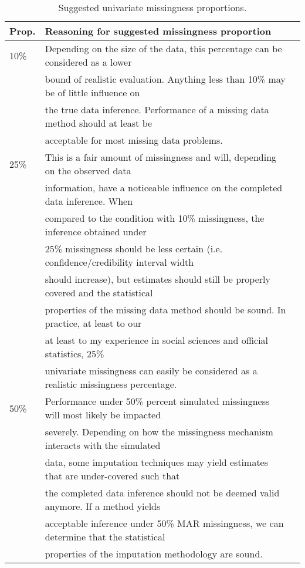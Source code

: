 \documentclass[bimj,fleqn]{w-art}
\begin{document}
\begin{table}[htb]
\begin{center}
\caption{Suggested univariate missingness proportions.}
\label{table:prop}
\begin{tabular}{lll}
\hline
Prop. & Reasoning for suggested missingness proportion \\
\hline  
10\%  & Depending on the size of the data, this percentage can be considered as a lower \\
      & bound of realistic evaluation. Anything less than 10\% may be of little influence on \\
      & the true data inference. Performance of a missing data method should at least be \\
      & acceptable for most missing data problems. \\ %
25\%  & This is a fair amount of missingness and will, depending on the observed data \\
      & information, have a noticeable influence on the completed data inference. When \\
      & compared to the condition with 10\% missingness, the inference obtained under \\
      & 25\% missingness should be less certain (i.e. confidence/credibility interval width \\
      & should increase), but estimates should still be properly covered and the statistical \\
      & properties of the missing data method should be sound. In practice, at least to our \\
      & at least to my experience in social sciences and official statistics, 25\% \\
      & univariate missingness can easily be considered as a realistic missingness percentage. \\ %
50\%  & Performance under 50\% percent simulated missingness will most likely be impacted \\ 
      & severely. Depending on how the missingness mechanism interacts with the simulated \\
      & data, some imputation techniques may yield estimates that are under-covered such that \\
      & the completed data inference should not be deemed valid anymore. If a method yields \\
      & acceptable inference under 50\% MAR missingness, we can determine that the statistical \\
      & properties of the imputation methodology are sound. \\
\hline
\end{tabular}
\end{center}
\end{table}
\end{document}
